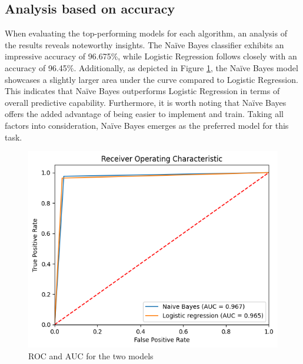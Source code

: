 \documentclass{class}
\begin{document}
\subsection{Analysis based on accuracy}
When evaluating the top-performing models for each algorithm, an analysis of the results reveals noteworthy insights.
The Naïve Bayes classifier exhibits an impressive accuracy of 96.675\%, while Logistic Regression follows closely with an accuracy of 96.45\%.
Additionally, as depicted in Figure \ref{fig-11}, the Naïve Bayes model showcases a slightly larger area under the curve compared to Logistic Regression.
This indicates that Naïve Bayes outperforms Logistic Regression in terms of overall predictive capability.
Furthermore, it is worth noting that Naïve Bayes offers the added advantage of being easier to implement and train.
Taking all factors into consideration, Naïve Bayes emerges as the preferred model for this task.

\begin{figure}[h]
    \centering
    \includegraphics[width=0.6\columnwidth]{images/comparison.png}
    \caption{ROC and AUC for the two models}
    \label{fig-11}
\end{figure}
\end{document}

